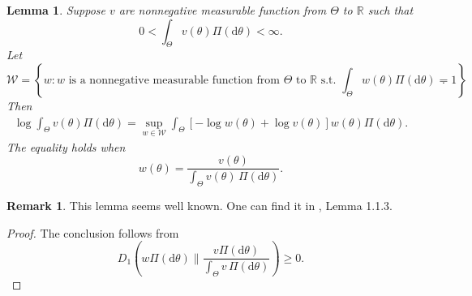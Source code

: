 \documentclass[11pt]{article}
\theoremstyle{plain}
\newtheorem{lemma}{\quad\quad Lemma}
\theoremstyle{definition}
\newtheorem{remark}{\quad\quad Remark}
\theoremstyle{remark}
\begin{document}
\begin{lemma}
    Suppose $v$ are nonnegative measurable function from $\Theta$ to $\mathbb R$ such that
    \begin{equation*}
      0<\int_{\Theta} v(\theta) \Pi(\mathrm d \theta)< \infty.
    \end{equation*}
    Let 
    \begin{equation*}
        \mathcal W = \left\{ 
            w: \text{$w$ is a nonnegative measurable function from $\Theta$ to $\mathbb R$ s.t. 
$\int_{\Theta} w(\theta) \Pi(\mathrm d \theta)=1$}
        \right\} .
    \end{equation*}
    Then 
    \begin{align*}
        \log \int_{\Theta} v(\theta) \Pi (\mathrm d \theta)
        =
        \sup_{w \in \mathcal W }\int_{\Theta} \left[ - \log w(\theta) +  \log v(\theta)   \right]w(\theta) \Pi(\mathrm d \theta) .
    \end{align*}
    The equality holds when
    \begin{equation*}
        w(\theta) = \frac{v(\theta)}{ \int_{\Theta} v(\theta)\,\Pi(\mathrm d \theta )} .
    \end{equation*}
    \label{lemma:variation}
\end{lemma}
\begin{remark}
    This lemma seems well known.
    One can find it in \cite{Catoni2007}, Lemma 1.1.3.
    
\end{remark}
\begin{proof}
    The conclusion follows from
    \begin{equation*}
        D_1\left(w \Pi(\mathrm d \theta )\Big\| \frac{v \Pi(\mathrm d \theta )}{ \int_{\Theta} v\,\Pi(\mathrm d \theta )} \right)  \geq 0.
    \end{equation*}
\end{proof}
\end{document}
